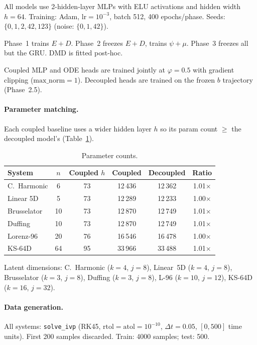 \documentclass{article}
\begin{document}
All models use 2-hidden-layer MLPs with ELU activations and hidden
width $h{=}64$.  Training: Adam, $\mathrm{lr}{=}10^{-3}$, batch 512,
400 epochs/phase.  Seeds: $\{0,1,2,42,123\}$ (noise: $\{0,1,42\}$).

Phase~1 trains $E{+}D$.  Phase~2 freezes $E{+}D$, trains $\psi{+}\mu$.
Phase~3 freezes all but the GRU.  DMD is fitted post-hoc.

Coupled MLP and ODE heads are trained jointly at $\varphi{=}0.5$ with
gradient clipping ($\mathrm{max\_norm}{=}1$).
Decoupled heads are trained on the frozen $b$ trajectory (Phase~2.5).

\paragraph{Parameter matching.}\label{app:params}
Each coupled baseline uses a wider hidden layer $h$ so its param
count $\ge$ the decoupled model's (Table~\ref{tab:paramcounts}).

\begin{table}[H]
\centering\small
\caption{Parameter counts.}
\label{tab:paramcounts}
\begin{tabular}{lccccc}
\toprule
System & $n$ & Coupled $h$ & Coupled & Decoupled & Ratio \\
\midrule
C.~Harmonic & 6  & 73 & 12\,436 & 12\,362 & 1.01$\times$ \\
Linear 5D   & 5  & 73 & 12\,289 & 12\,233 & 1.00$\times$ \\
Brusselator & 10 & 73 & 12\,870 & 12\,749 & 1.01$\times$ \\
Duffing     & 10 & 73 & 12\,870 & 12\,749 & 1.01$\times$ \\
Lorenz-96   & 20 & 76 & 16\,546 & 16\,478 & 1.00$\times$ \\
KS-64D      & 64 & 95 & 33\,966 & 33\,488 & 1.01$\times$ \\
\bottomrule
\end{tabular}
\end{table}
\noindent
Latent dimensions: C.~Harmonic ($k{=}4$, $j{=}8$),
Linear~5D ($k{=}4$, $j{=}8$), Brusselator ($k{=}3$, $j{=}8$),
Duffing ($k{=}3$, $j{=}8$), L-96 ($k{=}10$, $j{=}12$),
KS-64D ($k{=}16$, $j{=}32$).

\paragraph{Data generation.}
All systems: \texttt{solve\_ivp} (RK45, $\mathrm{rtol}{=}\mathrm{atol}{=}10^{-10}$,
$\Delta t{=}0.05$, $[0,500]$ time units).  First 200 samples
discarded.  Train: 4000 samples; test: 500.
\end{document}
